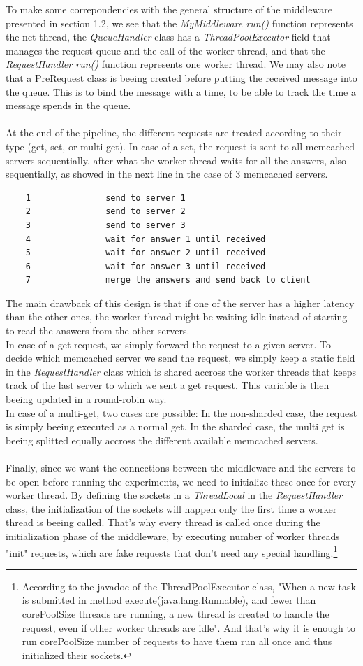\documentclass[11pt,a4paper]{article}
\begin{document}
To make some correpondencies with the general structure of the middleware presented in section 1.2, we see that the \textit{MyMiddleware run()} function represents the net thread, the \textit{QueueHandler} class has a \textit{ThreadPoolExecutor} field that manages the request queue and the call of the worker thread, and that the \textit{RequestHandler run()} function represents one worker thread. We may also note that a PreRequest class is beeing created before putting the received message into the queue. This is to bind the message with a time, to be able to track the time a message spends in the queue. 
\\\\
At the end of the pipeline, the different requests are treated according to their type (get, set, or multi-get). In case of a set, the request is sent to all memcached servers sequentially, after what the worker thread waits for all the answers, also sequentially, as showed in the next line in the case of 3 memcached servers. 
\begin{lstlisting}
	1				send to server 1
	2				send to server 2
	3				send to server 3
	4				wait for answer 1 until received
	5				wait for answer 2 until received
	6				wait for answer 3 until received
	7				merge the answers and send back to client
\end{lstlisting}
The main drawback of this design is that if one of the server has a higher latency than the other ones, the worker thread might be waiting idle instead of starting to read the answers from the other servers. 
\\
In case of a get request, we simply forward the request to a given server. To decide which memcached server we send the request, we simply keep a static field in the \textit{RequestHandler} class which is shared accross the worker threads that keeps track of the last server to which we sent a get request. This variable is then beeing updated in a round-robin way. 
\\
In case of a multi-get, two cases are possible: In the non-sharded case, the request is simply beeing executed as a normal get. In the sharded case, the multi get is beeing splitted equally accross the different available memcached servers.   
\\\\
Finally, since we want the connections between the middleware and the servers to be open before running the experiments, we need to initialize these once for every worker thread. By defining the sockets in a \textit{ThreadLocal} in the \textit{RequestHandler} class, the initialization of the sockets will happen only the first time a worker thread is beeing called. That's why every thread is called once during the initialization phase of the middleware, by executing number of worker threads "init" requests, which are fake requests that don't need any special handling.\footnote{According to the javadoc of the ThreadPoolExecutor class, "When a new task is submitted in method execute(java.lang.Runnable), and fewer than corePoolSize threads are running, a new thread is created to handle the request, even if other worker threads are idle". And that's why it is enough to run corePoolSize number of requests to have them run all once and thus initialized their sockets.} 
\end{document}
